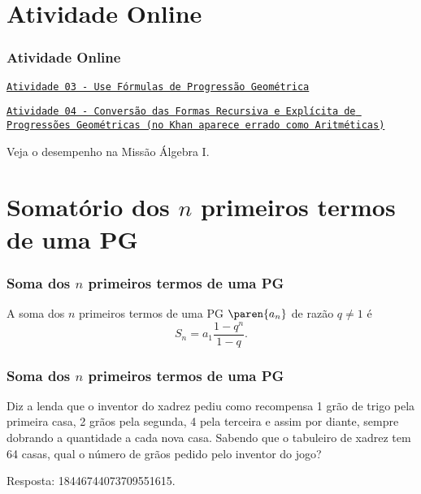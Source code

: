 \documentclass[brazil, notheorems, 10pt]{beamer}
\begin{document}
\section{Atividade Online}
\begin{frame}
\frametitle{Atividade Online} %

\href{https://pt.khanacademy.org/math/algebra/sequences/introduction-to-geometric-sequences/e/geometric_sequences_2}
{{\tt Atividade 03 - Use Fórmulas de Progressão Geométrica}}

\href{https://pt.khanacademy.org/math/algebra/sequences/constructing-geometric-sequences/e/explicit-and-recursive-formulas-of-geometric-sequences}
{{\tt Atividade 04 - Conversão das Formas Recursiva e Explícita de
Progressões Geométricas (no Khan aparece errado como Aritméticas)}}


Veja o desempenho na Missão Álgebra I.
\end{frame}

\section{Somatório dos $n$ primeiros termos de uma PG}
\begin{frame}
\frametitle{Soma dos $n$ primeiros termos de uma PG} %

\begin{Prop}
A soma dos $n$ primeiros termos de uma PG $\paren {a_n}$ de razão $q
\neq 1$ é $$S_n = a_1 \frac{1-q^n}{1-q}.$$
\end{Prop}

\end{frame}
\begin{frame}
\frametitle{Soma dos $n$ primeiros termos de uma PG} %

\begin{Exem}
Diz a lenda que o inventor do xadrez pediu como recompensa 1 grão de
trigo pela primeira casa, 2 grãos pela segunda, 4 pela terceira e
assim por diante, sempre dobrando a quantidade a cada nova casa.
Sabendo que o tabuleiro de xadrez tem 64 casas, qual o número de
grãos pedido pelo inventor do jogo?
\end{Exem}\pause

Resposta: 18446744073709551615.

\end{frame}
\end{document}

